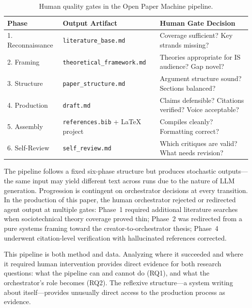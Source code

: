 \documentclass{article}
\begin{document}
\begin{table}[ht]
\centering
\small
\caption{Human quality gates in the Open Paper Machine pipeline.}
\label{tab:quality_gates}
\begin{tabularx}{\textwidth}{@{} l X X @{}}
\toprule
\textbf{Phase} & \textbf{Output Artifact} & \textbf{Human Gate Decision} \\
\midrule
1. Reconnaissance & \texttt{literature\_base.md} & Coverage sufficient? Key strands missing? \\
2. Framing & \texttt{theoretical\_framework.md} & Theories appropriate for IS audience? Gap novel? \\
3. Structure & \texttt{paper\_structure.md} & Argument structure sound? Sections balanced? \\
4. Production & \texttt{draft.md} & Claims defensible? Citations verified? Voice acceptable? \\
5. Assembly & \texttt{references.bib} + \LaTeX{} project & Compiles cleanly? Formatting correct? \\
6. Self-Review & \texttt{self\_review.md} & Which critiques are valid? What needs revision? \\
\bottomrule
\end{tabularx}
\end{table}

The pipeline follows a fixed six-phase structure but produces stochastic outputs---the same input may yield different text across runs due to the nature of LLM generation. Progression is contingent on orchestrator decisions at every transition. In the production of this paper, the human orchestrator rejected or redirected agent output at multiple gates: Phase~1 required additional literature searches when sociotechnical theory coverage proved thin; Phase~2 was redirected from a pure systems framing toward the creator-to-orchestrator thesis; Phase~4 underwent citation-level verification with hallucinated references corrected.

This pipeline is both method and data. Analyzing where it succeeded and where it required human intervention provides direct evidence for both research questions: what the pipeline can and cannot do (RQ1), and what the orchestrator's role becomes (RQ2). The reflexive structure---a system writing about itself---provides unusually direct access to the production process as evidence.
\end{document}

